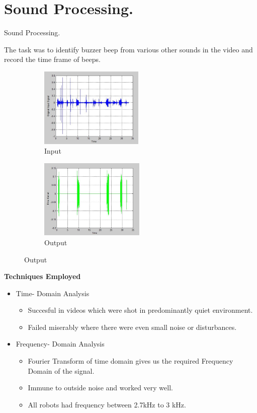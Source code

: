 \documentclass[10pt, a4paper]{beamer}
\begin{document}
\section{Sound Processing.}
\begin{frame}{\begin{center}
Sound Processing.
		\end{center}}\vspace{-1 cm}
		The task was to identify buzzer beep from various other sounds in the video and record the time frame of beeps.
		\begin{figure}[h!]
			\begin{subfigure}{0.4\textwidth}
				\includegraphics[width=0.8\linewidth, height=3.8cm]{input.jpg}
				\caption{Input}
			\end{subfigure}
			\begin{subfigure}{0.4\textwidth}
				\includegraphics[width=0.8\linewidth, height=3.8cm]{output.jpg}
				\caption{Output}
			\end{subfigure}
		\end{figure}	
\end{frame}

\begin{frame}
	\textbf{Techniques Employed}
	\begin{itemize}
		\item {Time- Domain Analysis}\\
		\begin{itemize}
			\item {Succesful in videos which were shot in predominantly quiet environment.}
			\item{Failed miserably where there were even small noise or disturbances.}
		\end{itemize}
		\item {Frequency- Domain Analysis}\\
		\begin{itemize}
			\item {Fourier Transform of time domain gives us the required Frequency Domain of the signal.}
			\item{Immune to outside noise and worked very well.}
			\item{All robots had frequency between 2.7kHz to 3 kHz.}
		\end{itemize}
	\end{itemize}
\end{frame}
\end{document}
